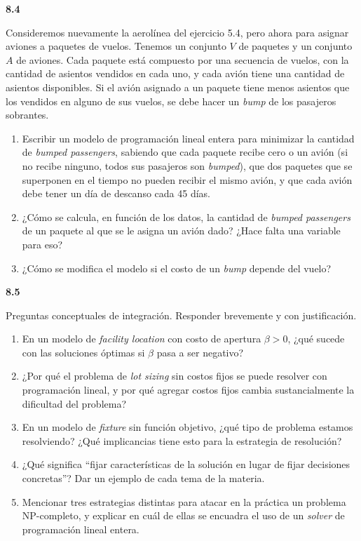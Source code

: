 \documentclass[11pt,a4paper]{article}
\newcommand{\ejercicio}[1]{\par\medskip\noindent\textbf{#1}\par\nopagebreak\smallskip}
\begin{document}
\ejercicio{8.4}
Consideremos nuevamente la aerolínea del ejercicio 5.4, pero ahora para asignar
aviones a paquetes de vuelos. Tenemos un conjunto $V$ de paquetes y un conjunto
$A$ de aviones. Cada paquete está compuesto por una secuencia de vuelos, con la
cantidad de asientos vendidos en cada uno, y cada avión tiene una cantidad de
asientos disponibles. Si el avión asignado a un paquete tiene menos asientos que
los vendidos en alguno de sus vuelos, se debe hacer un \emph{bump} de los
pasajeros sobrantes.
\begin{enumerate}
  \item Escribir un modelo de programación lineal entera para minimizar la
  cantidad de \emph{bumped passengers}, sabiendo que cada paquete recibe cero o
  un avión (si no recibe ninguno, todos sus pasajeros son \emph{bumped}), que
  dos paquetes que se superponen en el tiempo no pueden recibir el mismo avión,
  y que cada avión debe tener un día de descanso cada 45 días.
  \item ¿Cómo se calcula, en función de los datos, la cantidad de
  \emph{bumped passengers} de un paquete al que se le asigna un avión dado?
  ¿Hace falta una variable para eso?
  \item ¿Cómo se modifica el modelo si el costo de un \emph{bump} depende del
  vuelo?
\end{enumerate}

\ejercicio{8.5}
Preguntas conceptuales de integración. Responder brevemente y con justificación.
\begin{enumerate}[itemsep=1pt]
  \item En un modelo de \emph{facility location} con costo de apertura
  $\beta > 0$, ¿qué sucede con las soluciones óptimas si $\beta$ pasa a ser
  negativo?
  \item ¿Por qué el problema de \emph{lot sizing} sin costos fijos se puede
  resolver con programación lineal, y por qué agregar costos fijos cambia
  sustancialmente la dificultad del problema?
  \item En un modelo de \emph{fixture} sin función objetivo, ¿qué tipo de
  problema estamos resolviendo? ¿Qué implicancias tiene esto para la estrategia
  de resolución?
  \item ¿Qué significa ``fijar características de la solución en lugar de fijar
  decisiones concretas''? Dar un ejemplo de cada tema de la materia.
  \item Mencionar tres estrategias distintas para atacar en la práctica un
  problema NP-completo, y explicar en cuál de ellas se encuadra el uso de un
  \emph{solver} de programación lineal entera.
\end{enumerate}
\end{document}
